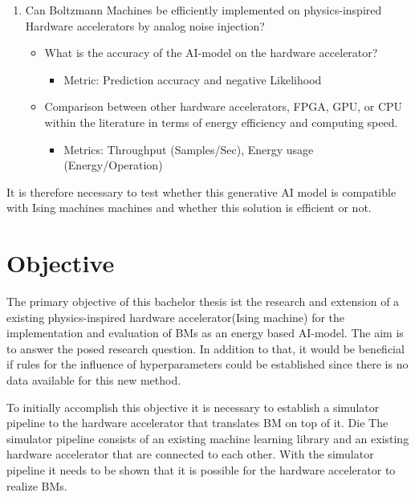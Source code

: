\begin{enumerate}
    \item Can Boltzmann Machines be efficiently implemented on physics-inspired Hardware accelerators by analog noise injection?
        \begin{itemize}
            \item What is the accuracy of the AI-model on the hardware accelerator?
                \begin{itemize}
                    \item Metric: Prediction accuracy and negative Likelihood
                \end{itemize}
            \item Comparison between other hardware accelerators, FPGA, GPU, or CPU within the literature in terms of energy efficiency and computing speed.
                \begin{itemize}
                    \item Metrics: Throughput (Samples/Sec), Energy usage (Energy/Operation)
                \end{itemize}
        \end{itemize}  
\end{enumerate}

It is therefore necessary to test whether this generative AI model is compatible with Ising machines
machines and whether this solution is efficient or not.


\section{Objective}

The primary objective of this bachelor thesis ist the research and extension of a existing physics-inspired
hardware accelerator(Ising machine) for the implementation and evaluation of \ac{BM}s as an energy based 
AI-model. The aim is to answer the posed research question. 
In addition to that, it would be beneficial if rules for the influence of hyperparameters could be established
since there is no data available for this new method.

To initially accomplish this objective it is necessary to establish a simulator pipeline to the
hardware accelerator that translates \ac{BM} on top of it. Die
The simulator pipeline consists of an existing machine learning library and an existing hardware accelerator
that are connected to each other.
With the simulator pipeline it needs to be shown that it is possible for the hardware accelerator
to realize \ac{BM}s.

